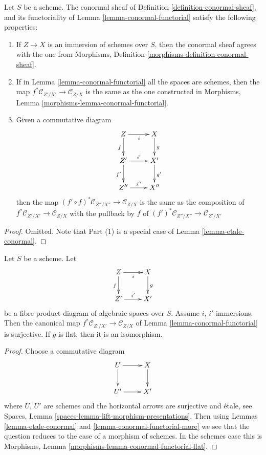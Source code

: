\begin{lemma}
\label{lemma-conormal-functorial-more}
Let $S$ be a scheme. The conormal sheaf of
Definition \ref{definition-conormal-sheaf}, and its functoriality of
Lemma \ref{lemma-conormal-functorial}
satisfy the following properties:
\begin{enumerate}
\item If $Z \to X$ is an immersion of schemes over $S$, then the conormal
sheaf agrees with the one from
Morphisms, Definition \ref{morphisms-definition-conormal-sheaf}.
\item If in
Lemma \ref{lemma-conormal-functorial}
all the spaces are schemes, then the map
$f^*\mathcal{C}_{Z'/X'} \to \mathcal{C}_{Z/X}$ is the same
as the one constructed in
Morphisms, Lemma \ref{morphisms-lemma-conormal-functorial}.
\item Given a commutative diagram
$$
\xymatrix{
Z \ar[r]_i \ar[d]_f & X \ar[d]^g \\
Z' \ar[r]^{i'} \ar[d]_{f'} & X' \ar[d]^{g'} \\
Z'' \ar[r]^{i''} & X''
}
$$
then the map $(f' \circ f)^*\mathcal{C}_{Z''/X''} \to \mathcal{C}_{Z/X}$
is the same as the composition of
$f^*\mathcal{C}_{Z'/X'} \to \mathcal{C}_{Z/X}$
with the pullback by $f$ of
$(f')^*\mathcal{C}_{Z''/X''} \to \mathcal{C}_{Z'/X'}$
\end{enumerate}
\end{lemma}

\begin{proof}
Omitted. Note that Part (1) is a special case of
Lemma \ref{lemma-etale-conormal}.
\end{proof}

\begin{lemma}
\label{lemma-conormal-functorial-flat}
Let $S$ be a scheme. Let
$$
\xymatrix{
Z \ar[r]_i \ar[d]_f & X \ar[d]^g \\
Z' \ar[r]^{i'} & X'
}
$$
be a fibre product diagram of algebraic spaces over $S$. Assume
$i$, $i'$ immersions. Then the canonical map
$f^*\mathcal{C}_{Z'/X'} \to \mathcal{C}_{Z/X}$ of
Lemma \ref{lemma-conormal-functorial}
is surjective. If $g$ is flat, then it is an isomorphism.
\end{lemma}

\begin{proof}
Choose a commutative diagram
$$
\xymatrix{
U \ar[r] \ar[d] & X \ar[d] \\
U' \ar[r] & X'
}
$$
where $U$, $U'$ are schemes and the horizontal arrows are surjective
and \'etale, see
Spaces, Lemma \ref{spaces-lemma-lift-morphism-presentations}.
Then using
Lemmas \ref{lemma-etale-conormal} and \ref{lemma-conormal-functorial-more}
we see that the question reduces to the case of a morphism of schemes.
In the schemes case this is
Morphisms, Lemma \ref{morphisms-lemma-conormal-functorial-flat}.
\end{proof}

